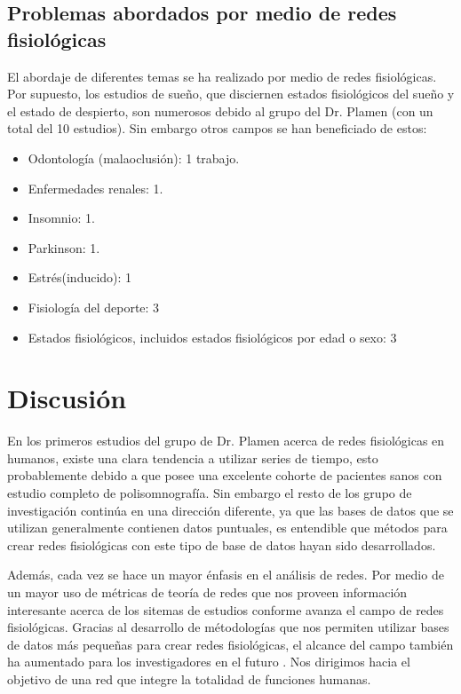 \documentclass[twoside,twocolumn]{article}
\begin{document}
\subsection{Problemas abordados por medio de redes fisiológicas}
El abordaje de diferentes temas se ha realizado por medio de redes fisiológicas. Por supuesto, los estudios de sueño, que disciernen estados fisiológicos del sueño y el estado de despierto, son numerosos debido al grupo del Dr. Plamen (con un total del 10 estudios).
Sin embargo otros campos se han beneficiado de estos:
\begin{itemize}
  \item Odontología (malaoclusión): 1 trabajo. \cite{scala2014complex}
  \item Enfermedades renales: 1. \cite{tan2020organ}
  \item Insomnio: 1. \cite{jansen2019network}
  \item Parkinson: 1. \cite{monti2018network}
  \item Estrés(inducido): 1 \cite{zanetti2019information}
  \item Fisiología del deporte: 3\cite{balague2020network}\cite{pereira2018computational}\cite{pereira2019complex}
  \item Estados fisiológicos, incluidos estados fisiológicos por edad o sexo: 3\cite{chmiel2014spreading}\cite{barajas2020metabolic}\cite{lehnertz2020human}\cite{barajas2021physiological}\cite{barajas2021sex}
\end{itemize}
\section{Discusión}
En los primeros estudios del grupo de Dr. Plamen acerca de redes fisiológicas en humanos, existe una clara tendencia a utilizar series de tiempo, esto probablemente debido a que posee una excelente cohorte de pacientes sanos con estudio completo de polisomnografía\cite{bashan2012network}.
Sin embargo el resto de los grupo de investigación continúa en una dirección diferente, ya que las bases de datos que se utilizan generalmente contienen datos puntuales, es entendible que métodos para crear redes fisiológicas con este tipo de base de datos hayan sido desarrollados.

Además, cada vez se hace un mayor énfasis en el análisis de redes.
Por medio de un mayor uso de métricas de teoría de redes que nos proveen información interesante acerca de los sitemas de estudios conforme avanza el campo de redes fisiológicas.
Gracias al desarrollo de métodologías que nos permiten utilizar bases de datos más pequeñas para crear redes fisiológicas, el alcance del campo también ha aumentado para los investigadores en el futuro \cite{cohen2021robust}.
Nos dirigimos hacia el objetivo de una red que integre la totalidad de funciones humanas\cite{barajas2021physiological}.
\end{document}
